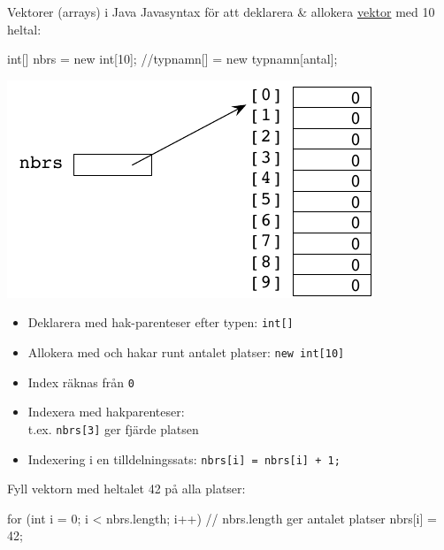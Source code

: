 \documentclass{lecturenotes}
\begin{document}
\begin{Slide}{Vektorer (arrays) i Java} \footnotesize
Javasyntax för att deklarera \& allokera \href{https://docs.oracle.com/javase/specs/jls/se8/html/jls-10.html} {vektor}  med 10 heltal:
\begin{Code}
int[] nbrs = new int[10];      //typnamn[] = new typnamn[antal];
\end{Code}

\begin{multicols*}{2}
\includegraphics[scale=0.8]{img/vektorbild1.pdf}
\columnbreak
\begin{itemize}\scriptsize
\item Deklarera med hak-parenteser efter typen: \lstinline{int[]}
\item Allokera med  och hakar runt antalet platser: \lstinline{new int[10]}
\item Index räknas från \lstinline{0}
\item Indexera med hakparenteser: \\ t.ex. \lstinline{nbrs[3]} ger fjärde platsen
\item Indexering i en tilldelningssats: \lstinline{nbrs[i] = nbrs[i] + 1;} 
\end{itemize}
\end{multicols*}

Fyll vektorn med heltalet 42 på alla platser:
\begin{Code}
for (int i = 0; i < nbrs.length; i++) {  // nbrs.length ger antalet platser 
    nbrs[i] = 42;
}
\end{Code}
\end{Slide} 
\end{document}
